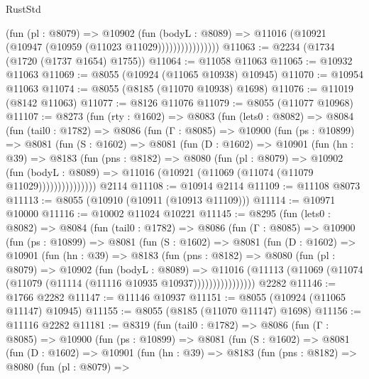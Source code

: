 \begin{lexlean}{RustStd}
\begin{coremodule}
                        (fun (pl : @8079) =>
                        @10902
                          (fun (bodyL : @8089) =>
                          @11016 (@10921 (@10947 (@10959 (@11023 @11029))))))))))))))))
@11063 := @2234 (@1734 (@1720 (@1737 @1654) @1755))
@11064 := @11058 @11063
@11065 := @10932 @11063
@11069 := @8055 (@10924 (@11065 @10938) @10945)
@11070 := @10954 @11063
@11074 := @8055 (@8185 (@11070 @10938) @1698)
@11076 := @11019 (@8142 @11063)
@11077 := @8126 @11076
@11079 := @8055 (@11077 @10968)
@11107 := @8273
    (fun (rty : @1602) =>
    @8083
      (fun (lets0 : @8082) =>
      @8084
        (fun (tail0 : @1782) =>
        @8086
          (fun (Γ : @8085) =>
          @10900
            (fun (ps : @10899) =>
            @8081
              (fun (S : @1602) =>
              @8081
                (fun (D : @1602) =>
                @10901
                  (fun (hn : @39) =>
                  @8183
                    (fun (pns : @8182) =>
                    @8080
                      (fun (pl : @8079) =>
                      @10902
                        (fun (bodyL : @8089) =>
                        @11016 (@10921 (@11069 (@11074 (@11079 @11029)))))))))))))))
    @2114
@11108 := @10914 @2114
@11109 := @11108 @8073
@11113 := @8055 (@10910 (@10911 (@10913 @11109)))
@11114 := @10971 @10000
@11116 := @10002 @11024 @10221
@11145 := @8295
    (fun (lets0 : @8082) =>
    @8084
      (fun (tail0 : @1782) =>
      @8086
        (fun (Γ : @8085) =>
        @10900
          (fun (ps : @10899) =>
          @8081
            (fun (S : @1602) =>
            @8081
              (fun (D : @1602) =>
              @10901
                (fun (hn : @39) =>
                @8183
                  (fun (pns : @8182) =>
                  @8080
                    (fun (pl : @8079) =>
                    @10902
                      (fun (bodyL : @8089) =>
                      @11016
                        (@11113
                          (@11069 (@11074 (@11079 (@11114 (@11116 @10935 @10937))))))))))))))))
    @2282
@11146 := @1766 @2282
@11147 := @11146 @10937
@11151 := @8055 (@10924 (@11065 @11147) @10945)
@11155 := @8055 (@8185 (@11070 @11147) @1698)
@11156 := @11116 @2282
@11181 := @8319
    (fun (tail0 : @1782) =>
    @8086
      (fun (Γ : @8085) =>
      @10900
        (fun (ps : @10899) =>
        @8081
          (fun (S : @1602) =>
          @8081
            (fun (D : @1602) =>
            @10901
              (fun (hn : @39) =>
              @8183
                (fun (pns : @8182) =>
                @8080
                  (fun (pl : @8079) =>

\end{coremodule}
\end{lexlean}
